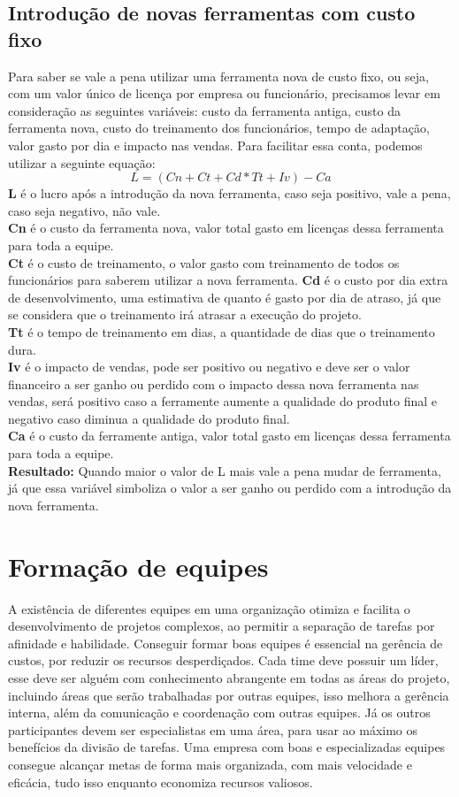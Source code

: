 \documentclass{article}
\begin{document}
\subsection{Introdução de novas ferramentas com custo fixo}
Para saber se vale a pena utilizar uma ferramenta nova de custo fixo, ou seja, com um valor único de licença por empresa ou funcionário, precisamos levar em consideração as seguintes variáveis: custo da ferramenta antiga, custo da ferramenta nova, custo do treinamento dos funcionários, tempo de adaptação, valor gasto por dia e impacto nas vendas. Para facilitar essa conta, podemos utilizar a seguinte equação:
$$ L = (Cn + Ct + Cd * Tt + Iv) - Ca $$
\textbf{L} é o lucro após a introdução da nova ferramenta, caso seja positivo, vale a pena, caso seja negativo, não vale. \\
\textbf{Cn} é o custo da ferramenta nova, valor total gasto em licenças dessa ferramenta para toda a equipe. \\
\textbf{Ct} é o custo de treinamento, o valor gasto com treinamento de todos os funcionários para saberem utilizar a nova ferramenta.
\textbf{Cd} é o custo por dia extra de desenvolvimento, uma estimativa de quanto é gasto por dia de atraso, já que se considera que o treinamento irá atrasar a execução do projeto. \\
\textbf{Tt} é o tempo de treinamento em dias, a quantidade de dias que o treinamento dura. \\
\textbf{Iv} é o impacto de vendas, pode ser positivo ou negativo e deve ser o valor financeiro a ser ganho ou perdido com o impacto dessa nova ferramenta nas vendas, será positivo caso a ferramente aumente a qualidade do produto final e negativo caso diminua a qualidade do produto final. \\
\textbf{Ca} é o custo da ferramente antiga, valor total gasto em licenças dessa ferramenta para toda a equipe.\\
\textbf{Resultado:} Quando maior o valor de L mais vale a pena mudar de ferramenta, já que essa variável simboliza o valor a ser ganho ou perdido com a introdução da nova ferramenta.


\section{Formação de equipes}
A existência de diferentes equipes em uma organização otimiza e facilita o desenvolvimento de projetos complexos, ao permitir a separação de tarefas por afinidade e habilidade. Conseguir formar boas equipes é essencial na gerência de custos, por reduzir os recursos desperdiçados. Cada time deve possuir um líder, esse deve ser alguém com conhecimento abrangente em todas as áreas do projeto, incluindo áreas que serão trabalhadas por outras equipes, isso melhora a gerência interna, além da comunicação e coordenação com outras equipes. Já os outros participantes devem ser especialistas em uma área, para usar ao máximo os benefícios da divisão de tarefas. Uma empresa com boas e especializadas equipes consegue alcançar metas de forma mais organizada, com mais velocidade e eficácia, tudo isso enquanto economiza recursos valiosos.
\end{document}
